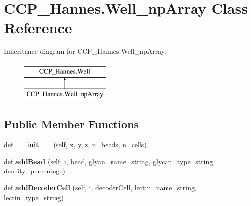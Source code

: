 \hypertarget{class_c_c_p___hannes_1_1_well__np_array}{}\section{C\+C\+P\+\_\+\+Hannes.\+Well\+\_\+np\+Array Class Reference}
\label{class_c_c_p___hannes_1_1_well__np_array}
Inheritance diagram for C\+C\+P\+\_\+\+Hannes.\+Well\+\_\+np\+Array\+:\begin{figure}[H]
\begin{center}
\leavevmode
\includegraphics[height=2.000000cm]{class_c_c_p___hannes_1_1_well__np_array}
\end{center}
\end{figure}
\subsection*{Public Member Functions}
\begin{DoxyCompactItemize}
\item 
\mbox{\label{class_c_c_p___hannes_1_1_well__np_array_ae9dcb8374add330e7be7bc24cf67b028}} 
def {\bfseries \+\_\+\+\_\+init\+\_\+\+\_\+} (self, x, y, z, n\+\_\+beads, n\+\_\+cells)
\item 
\mbox{\label{class_c_c_p___hannes_1_1_well__np_array_a7284a17bcbf1187f6d35d8a0328ba39e}} 
def {\bfseries add\+Bead} (self, i, bead, glyan\+\_\+name\+\_\+string, glycan\+\_\+type\+\_\+string, density\+\_\+percentage)
\item 
\mbox{\label{class_c_c_p___hannes_1_1_well__np_array_a9fb2c0fcfacb015b80ca23abe250e9ef}} 
def {\bfseries add\+Decoder\+Cell} (self, i, decoder\+Cell, lectin\+\_\+name\+\_\+string, lectin\+\_\+type\+\_\+string)
\end{DoxyCompactItemize}
